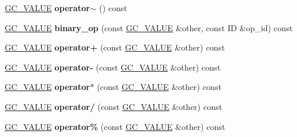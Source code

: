 \begin{DoxyCompactItemize}
\item 
\hyperlink{classswig_1_1GC__VALUE}{G\+C\+\_\+\+V\+A\+L\+UE} {\bfseries operator$\sim$} () const \hypertarget{classswig_1_1GC__VALUE_aa2c7528396dd6a67e8f17adf850cf1aa}{}\label{classswig_1_1GC__VALUE_aa2c7528396dd6a67e8f17adf850cf1aa}

\item 
\hyperlink{classswig_1_1GC__VALUE}{G\+C\+\_\+\+V\+A\+L\+UE} {\bfseries binary\+\_\+op} (const \hyperlink{classswig_1_1GC__VALUE}{G\+C\+\_\+\+V\+A\+L\+UE} \&other, const ID \&op\+\_\+id) const \hypertarget{classswig_1_1GC__VALUE_aabff11c21776f1388971c81b1e5cb9c3}{}\label{classswig_1_1GC__VALUE_aabff11c21776f1388971c81b1e5cb9c3}

\item 
\hyperlink{classswig_1_1GC__VALUE}{G\+C\+\_\+\+V\+A\+L\+UE} {\bfseries operator+} (const \hyperlink{classswig_1_1GC__VALUE}{G\+C\+\_\+\+V\+A\+L\+UE} \&other) const \hypertarget{classswig_1_1GC__VALUE_a58f20cb58e0e173ef9ac0cbeff6ce8ee}{}\label{classswig_1_1GC__VALUE_a58f20cb58e0e173ef9ac0cbeff6ce8ee}

\item 
\hyperlink{classswig_1_1GC__VALUE}{G\+C\+\_\+\+V\+A\+L\+UE} {\bfseries operator-\/} (const \hyperlink{classswig_1_1GC__VALUE}{G\+C\+\_\+\+V\+A\+L\+UE} \&other) const \hypertarget{classswig_1_1GC__VALUE_ab62b756b5892f745127221620b6cfc61}{}\label{classswig_1_1GC__VALUE_ab62b756b5892f745127221620b6cfc61}

\item 
\hyperlink{classswig_1_1GC__VALUE}{G\+C\+\_\+\+V\+A\+L\+UE} {\bfseries operator$\ast$} (const \hyperlink{classswig_1_1GC__VALUE}{G\+C\+\_\+\+V\+A\+L\+UE} \&other) const \hypertarget{classswig_1_1GC__VALUE_a1f6062e4e924e3e4821029cc467490d2}{}\label{classswig_1_1GC__VALUE_a1f6062e4e924e3e4821029cc467490d2}

\item 
\hyperlink{classswig_1_1GC__VALUE}{G\+C\+\_\+\+V\+A\+L\+UE} {\bfseries operator/} (const \hyperlink{classswig_1_1GC__VALUE}{G\+C\+\_\+\+V\+A\+L\+UE} \&other) const \hypertarget{classswig_1_1GC__VALUE_a0407453f49a9d3ebf9eb67c796501451}{}\label{classswig_1_1GC__VALUE_a0407453f49a9d3ebf9eb67c796501451}

\item 
\hyperlink{classswig_1_1GC__VALUE}{G\+C\+\_\+\+V\+A\+L\+UE} {\bfseries operator\%} (const \hyperlink{classswig_1_1GC__VALUE}{G\+C\+\_\+\+V\+A\+L\+UE} \&other) const \hypertarget{classswig_1_1GC__VALUE_a76780d51125e0fe469d63d1a04fd850d}{}\label{classswig_1_1GC__VALUE_a76780d51125e0fe469d63d1a04fd850d}


\end{DoxyCompactItemize}
